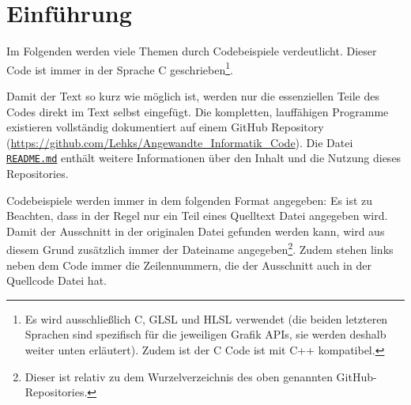 
\section{Einführung}

Im Folgenden werden viele Themen durch Codebeispiele verdeutlicht. Dieser Code ist immer in der Sprache C geschrieben\footnote{Es wird ausschließlich C, GLSL und HLSL verwendet (die beiden letzteren Sprachen sind spezifisch für die jeweiligen Grafik APIs, sie werden deshalb weiter unten erläutert). Zudem ist der C Code ist mit C++ kompatibel.}.

Damit der Text so kurz wie möglich ist, werden nur die essenziellen Teile des Codes direkt im Text selbst eingefügt. Die kompletten, lauffähigen Programme existieren vollständig dokumentiert auf einem GitHub Repository (\url{https://github.com/Lehks/Angewandte_Informatik_Code}). Die Datei \texttt{\href{https://github.com/Lehks/Angewandte_Informatik_Code/blob/master/README.md}{README.md}} enthält weitere Informationen über den Inhalt und die Nutzung dieses Repositories.

Codebeispiele werden immer in dem folgenden Format angegeben:
Es ist zu Beachten, dass in der Regel nur ein Teil eines Quelltext Datei angegeben wird. Damit der Ausschnitt in der originalen Datei gefunden werden kann, wird aus diesem Grund zusätzlich immer der Dateiname angegeben\footnote{Dieser ist relativ zu dem Wurzelverzeichnis des oben genannten GitHub-Repositories.}. Zudem stehen links neben dem Code immer die Zeilennummern, die der Ausschnitt auch in der Quellcode Datei hat.

